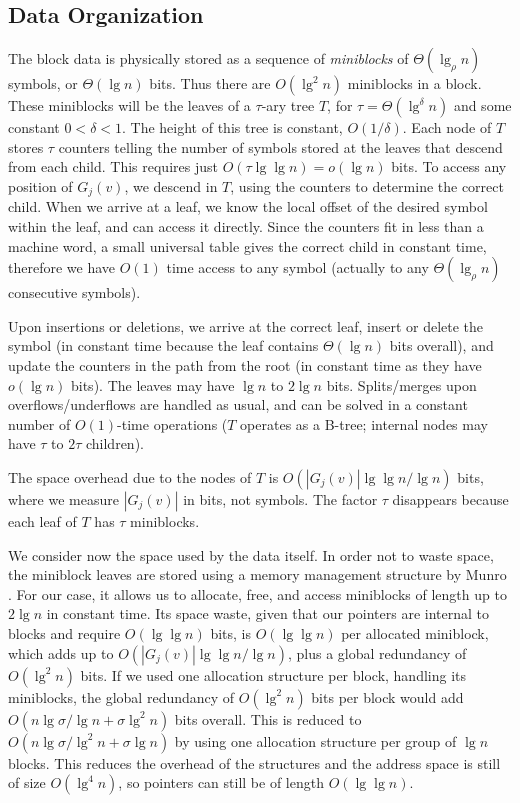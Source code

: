 \documentclass[11pt]{article}
\begin{document}
\subsection{Data Organization}

The block data is physically stored as a sequence of {\em miniblocks} of
$\Theta(\lg_\rho n)$ symbols, or $\Theta(\lg n)$ bits. Thus there are 
$O(\lg^2 n)$ mini\-blocks in a block. These miniblocks will be the 
leaves of a $\tau$-ary tree $T$, for $\tau = \Theta(\lg^\delta n)$ and some 
constant $0<\delta<1$. The height of this tree is constant, $O(1/\delta)$. 
Each node of $T$ stores $\tau$ counters telling the number 
of symbols stored at the leaves that descend from each child. This requires 
just $O(\tau \lg\lg n) = o(\lg n)$ bits. To access any position of $G_j(v)$,
we descend in $T$, using the counters to determine the correct child.
When we arrive at a leaf, we know the local offset of the desired symbol
within the leaf, and can access it directly. Since the counters fit in 
less than a machine word, a small universal table gives the correct child in 
constant time, therefore we have $O(1)$ time access to any symbol (actually to any 
$\Theta(\lg_\rho n)$ consecutive symbols).

Upon insertions or deletions, we arrive at the correct leaf, insert or delete 
the symbol (in constant time because the leaf contains $\Theta(\lg n)$ bits
overall), and update the counters in the path from the root (in constant time
as they have $o(\lg n)$ bits). The leaves may have $\lg n$ to $2\lg n$ bits.
Splits/merges upon overflows/underflows are handled as usual, and can be
solved in a constant number of $O(1)$-time operations ($T$
operates as a B-tree; internal nodes may have $\tau$ to $2\tau$ children).

The space overhead due to the nodes of $T$ is
$O(|G_j(v)| \lg\lg n / \lg n)$ bits, where we measure
$|G_j(v)|$ in bits, not symbols. The factor $\tau$ disappears 
because each leaf of $T$ has $\tau$ miniblocks. 

We consider now the space used by the data itself.
In order not to waste space, the miniblock leaves are stored using a memory
management structure by Munro \cite{Mun86}. For our case, it allows us to 
allocate, free, and access  miniblocks of length up to $2\lg n$ in
constant time. Its space waste, given that our pointers are internal to blocks
and require $O(\lg\lg n)$
bits, is $O(\lg\lg n)$ per allocated miniblock, which adds up to
$O(|G_j(v)|\lg\lg n / \lg n)$, plus a global redundancy
of $O(\lg^2 n)$ bits.
If we used one allocation structure per block, handling its miniblocks,
the global redundancy of $O(\lg^2 n)$ bits per block would add
$O(n\lg\sigma/\lg n + \sigma\lg^2 n)$ bits 
overall. This is reduced to $O(n\lg\sigma/\lg^2 n + \sigma\lg n)$ by
using one allocation structure per group of $\lg n$ blocks. This
reduces the overhead of the structures and the address space is
still of size $O(\lg^4 n)$, so pointers can still be of length $O(\lg\lg n)$.
\end{document}
